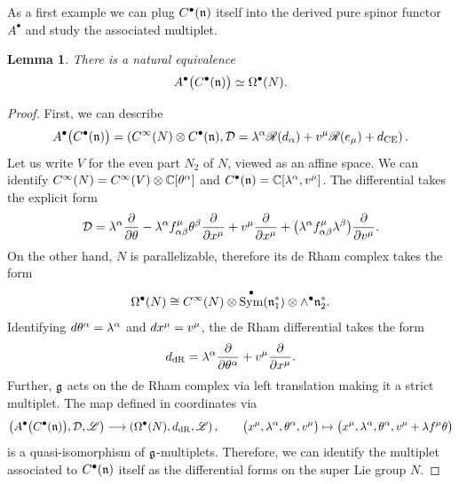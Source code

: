 \documentclass[11pt]{article}
\numberwithin{equation}{section}
\numberwithin{equation}{section}
\newtheorem{lem}[thm]{Lemma}
\def\d{{\rm d}}
\DeclareMathOperator{\Sym}{Sym}
\def\sL{\mathscr L}
\def\sR{\mathscr R}
\begin{document}
As a first example we can plug $C^\bullet(\mathfrak n)$ itself into the derived pure spinor functor $A^\bullet$ and study the associated multiplet.

\begin{lem}
	There is a natural equivalence
	\begin{equation*}
	A^\bullet\big(C^\bullet(\mathfrak n)\big) \simeq \Omega^\bullet(N).
	\end{equation*}
	
\end{lem}

\begin{proof}
	First, we can describe
	\begin{equation*}
	A^\bullet\big(C^\bullet(\fn)\big) = \left( C^\infty(N) \otimes C^\bullet(\fn) , \cD = \lambda^\alpha \sR(d_\alpha) + v^\mu \sR(e_\mu) + \d_{\mathrm{CE}} \right) .
	\end{equation*}
	Let us write $V$ for the even part $N_2$ of $N$, viewed as an affine space. We can identify $C^\infty(N) = C^\infty(V) \otimes \mathbb C[\theta^\alpha]$ and $C^\bullet(\mathfrak n) = \mathbb C[\lambda^\alpha , v^\mu]$. The differential takes the explicit form
	\begin{equation*}
	\mathcal D = \lambda^\alpha \frac{\partial}{\partial \theta} - \lambda^\alpha f^\mu_{\alpha \beta} \theta^\beta \frac{\partial}{\partial x^\mu} + v^\mu \frac{\partial}{\partial x^\mu} + \big(\lambda^\alpha f^\mu_{\alpha \beta} \lambda^\beta\big) \frac{\partial}{\partial v^\mu} .
	\end{equation*}
	On the other hand, $N$ is parallelizable, therefore its de Rham complex takes the form
	\begin{equation*}
	\Omega^\bullet(N) \cong C^\infty(N) \otimes \Sym^\bullet(\fn_1^*) \otimes \wedge^\bullet\fn_2^* .
	\end{equation*}
	Identifying $\d\theta^\alpha = \lambda^\alpha$ and $\d x^\mu = v^\mu$, the de Rham differential takes the form
	\begin{equation*}
	\d_{\mathrm{dR}} = \lambda^\alpha \frac{\partial}{\partial \theta^\alpha} + v^\mu \frac{\partial}{\partial x^\mu} .
	\end{equation*}
	Further, $\mathfrak g$ acts on the de Rham complex via left translation making it a strict multiplet. The map defined in coordinates via
	\begin{equation*}
	\big( A^\bullet\big(C^\bullet(\fn)\big) , \cD , \sL \big) \longrightarrow \left( \Omega^\bullet(N) , \d_{\mathrm{dR}} , \sL \right), \qquad \big(x^\mu, \lambda^\alpha, \theta^\alpha , v^\mu\big) \mapsto \big(x^\mu, \lambda^\alpha, \theta^\alpha, v^\mu + \lambda f^\mu \theta\big)
	\end{equation*}
	is a quasi-isomorphism of $\mathfrak g$-multiplets. Therefore, we can identify the multiplet associated to $C^\bullet(\mathfrak n)$ itself as the differential forms on the super Lie group $N$.
\end{proof}
\end{document}
